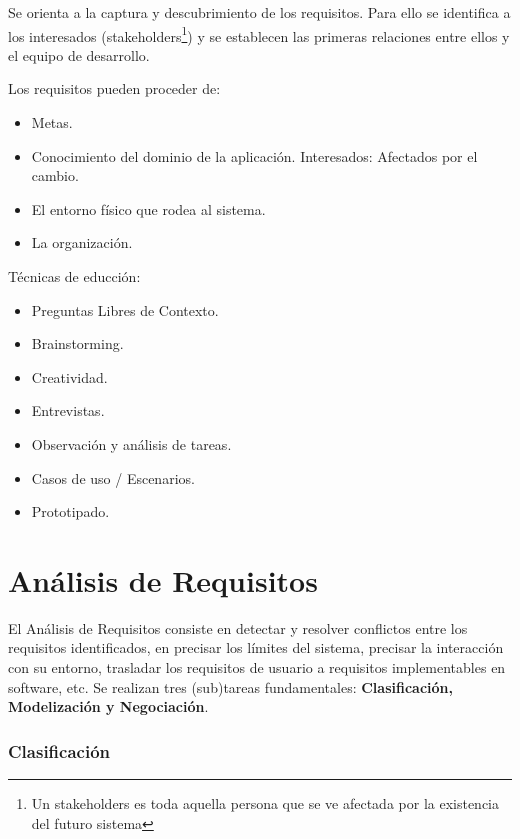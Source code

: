 Se orienta a la captura y descubrimiento de los requisitos. Para ello
se identifica a los interesados (stakeholders\footnote{Un stakeholders
  es toda aquella persona que se ve afectada por la existencia del
  futuro sistema}) y se establecen las primeras relaciones entre ellos
y el equipo de desarrollo.

Los requisitos pueden proceder de:
\begin{itemize}[noitemsep]
\item Metas.
\item Conocimiento del dominio de la aplicación. Interesados: Afectados por el cambio.
\item El entorno físico que rodea al sistema.
\item La organización.
\end{itemize}

Técnicas de educción:
\begin{itemize}[noitemsep]
\item Preguntas Libres de Contexto.
\item Brainstorming.
\item Creatividad.
\item Entrevistas.
\item Observación y análisis de tareas.
\item Casos de uso / Escenarios.
\item Prototipado.
\end{itemize}

\section{Análisis de Requisitos}
\label{sec:requisitos:analisis}

El Análisis de Requisitos consiste en detectar y resolver conflictos
entre los requisitos identificados, en precisar los límites del
sistema, precisar la interacción con su entorno, trasladar los
requisitos de usuario a requisitos implementables en software, etc. Se
realizan tres (sub)tareas fundamentales: \textbf{Clasificación, Modelización y
Negociación}.

\subsubsection{Clasificación}
\label{sec:requisitos:analisis:clasificacion}

